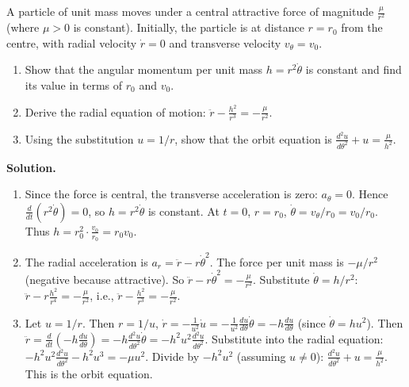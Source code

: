 \documentclass[11pt]{article}
\begin{document}
\begin{exoresolu}
A particle of unit mass moves under a central attractive force of magnitude $\frac{\mu}{r^2}$ (where $\mu > 0$ is constant). Initially, the particle is at distance $r = r_0$ from the centre, with radial velocity $\dot{r} = 0$ and transverse velocity $v_\theta = v_0$.
\begin{enumerate}
\item Show that the angular momentum per unit mass $h = r^2\dot{\theta}$ is constant and find its value in terms of $r_0$ and $v_0$.
\item Derive the radial equation of motion: $\ddot{r} - \frac{h^2}{r^3} = -\frac{\mu}{r^2}$.
\item Using the substitution $u = 1/r$, show that the orbit equation is $\frac{d^2u}{d\theta^2} + u = \frac{\mu}{h^2}$.
\end{enumerate}
\tcblower
\textbf{Solution.}
\begin{enumerate}
\item Since the force is central, the transverse acceleration is zero: $a_\theta = 0$. Hence $\frac{d}{dt}(r^2\dot{\theta}) = 0$, so $h = r^2\dot{\theta}$ is constant. At $t=0$, $r = r_0$, $\dot{\theta} = v_\theta/r_0 = v_0/r_0$. Thus $h = r_0^2 \cdot \frac{v_0}{r_0} = r_0 v_0$.
\item The radial acceleration is $a_r = \ddot{r} - r\dot{\theta}^2$. The force per unit mass is $-\mu/r^2$ (negative because attractive). So $\ddot{r} - r\dot{\theta}^2 = -\frac{\mu}{r^2}$. Substitute $\dot{\theta} = h/r^2$: $\ddot{r} - r\frac{h^2}{r^4} = -\frac{\mu}{r^2}$, i.e., $\ddot{r} - \frac{h^2}{r^3} = -\frac{\mu}{r^2}$.
\item Let $u = 1/r$. Then $r = 1/u$, $\dot{r} = -\frac{1}{u^2}\dot{u} = -\frac{1}{u^2}\frac{du}{d\theta}\dot{\theta} = -h\frac{du}{d\theta}$ (since $\dot{\theta} = h u^2$). Then $\ddot{r} = \frac{d}{dt}(-h\frac{du}{d\theta}) = -h\frac{d^2u}{d\theta^2}\dot{\theta} = -h^2 u^2 \frac{d^2u}{d\theta^2}$.
Substitute into the radial equation:
$-h^2 u^2 \frac{d^2u}{d\theta^2} - h^2 u^3 = -\mu u^2$.
Divide by $-h^2 u^2$ (assuming $u \neq 0$):
$\frac{d^2u}{d\theta^2} + u = \frac{\mu}{h^2}$.
This is the orbit equation.
\end{enumerate}
\end{exoresolu}
\end{document}
